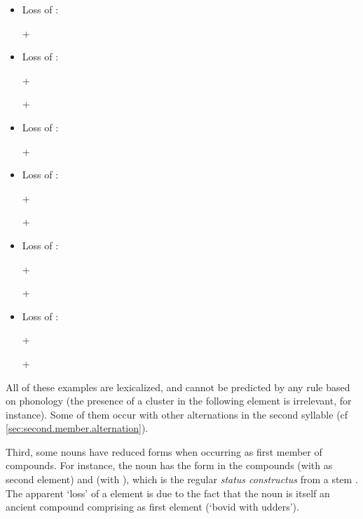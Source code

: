 \begin{itemize}
\item Loss of : 

  +  \fl{}    
\item Loss of  : 

 +  \fl{}   

  +  \fl{}   
\item Loss of : 

  +  \fl{}    
\item Loss of :

  +  \fl{}   

 +  \fl{}    
\item Loss of :

   +   \fl{}    
 
  +  \fl{}   
\item Loss of : 

 +  \fl{}    

 +  \fl{}    
\end{itemize}

All of these examples are lexicalized, and cannot be predicted by any rule based on phonology (the presence of a cluster in the following element is irrelevant, for instance). Some of them occur with other alternations in the second syllable (cf \ref{sec:second.member.alternation}).

Third, some nouns have reduced forms when occurring as first member of compounds. For instance, the noun  has the form  in the compounds  (with  as second element) and  (with ), which is the regular \textit{status constructus} from a stem . The apparent `loss' of a  element is due to the fact that the noun  is itself an ancient compound comprising  as first element (`bovid with udders').

